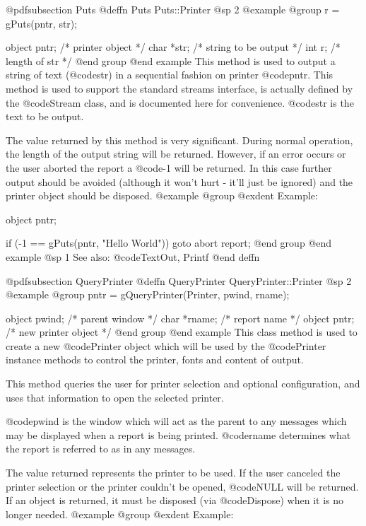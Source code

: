 @pdfsubsection {Puts}
@deffn {Puts} Puts::Printer
@sp 2
@example
@group
r = gPuts(pntr, str);

object   pntr;  /*  printer object        */
char    *str;   /*  string to be output   */
int      r;     /*  length of str         */
@end group
@end example
This method is used to output a string of text (@code{str}) in a sequential
fashion on printer @code{pntr}.  This method is used to support the standard
streams interface, is actually defined by the @code{Stream} class, and
is documented here for convenience. @code{str} is the text to be output. 

The value returned by this method is very significant.  During normal
operation, the length of the output string will be returned.  However,
if an error occurs or the user aborted the report a @code{-1} will be
returned.  In this case further output should be avoided (although it
won't hurt - it'll just be ignored) and the printer object should be
disposed.
@example
@group
@exdent Example:

object  pntr;

if (-1 == gPuts(pntr, "Hello World\n"))
        goto abort report;
@end group
@end example
@sp 1
See also:  @code{TextOut, Printf}
@end deffn











@pdfsubsection {QueryPrinter}
@deffn {QueryPrinter} QueryPrinter::Printer
@sp 2
@example
@group
pntr = gQueryPrinter(Printer, pwind, rname); 

object  pwind;  /*  parent window       */
char    *rname; /*  report name         */
object  pntr;   /*  new printer object  */
@end group
@end example
This class method is used to create a new @code{Printer} object which
will be used by the @code{Printer} instance methods to control the
printer, fonts and content of output.

This method queries the user for printer selection and optional
configuration, and uses that information to open the selected
printer.

@code{pwind} is the window which will act as the parent to any
messages which may be displayed when a report is being printed.
@code{rname} determines what the report is referred to as in any
messages.

The value returned represents the printer to be used.  If the user
canceled the printer selection or the printer couldn't be opened,
@code{NULL} will be returned. If an object is returned, it must be
disposed (via @code{Dispose}) when it is no longer needed.
@example
@group
@exdent Example:

